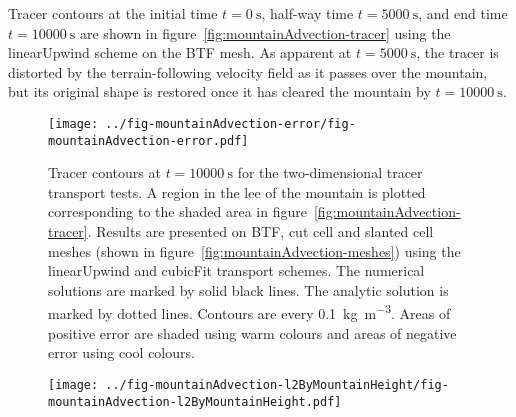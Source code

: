 Tracer contours at the initial time $t=\SI{0}{\second}$, half-way time $t=\SI{5000}{\second}$, and end time $t=\SI{10000}{\second}$ are shown in figure~\ref{fig:mountainAdvection-tracer} using the linearUpwind scheme on the BTF mesh.  As apparent at $t=\SI{5000}{\second}$, the tracer is distorted by the terrain-following velocity field as it passes over the mountain, but its original shape is restored once it has cleared the mountain by $t=\SI{10000}{\second}$.

\begin{figure}
	\centering
	\texttt{[image: ../fig-mountainAdvection-error/fig-mountainAdvection-error.pdf]}
	\caption{Tracer contours at $t=\SI{10000}{\second}$ for the two-dimensional tracer transport tests.  A region in the lee of the mountain is plotted corresponding to the shaded area in figure~\ref{fig:mountainAdvection-tracer}.  Results are presented on BTF, cut cell and slanted cell meshes (shown in figure~\ref{fig:mountainAdvection-meshes}) using the linearUpwind and cubicFit transport schemes.  The numerical solutions are marked by solid black lines.  The analytic solution is marked by dotted lines.  Contours are every \SI{0.1}{\kilo\gram\per\meter\cubed}.  Areas of positive error are shaded using warm colours and areas of negative error using cool colours.}
	\label{fig:mountainAdvection-errors}
\end{figure}


\begin{figure}
	\centering
	\texttt{[image: ../fig-mountainAdvection-l2ByMountainHeight/fig-mountainAdvection-l2ByMountainHeight.pdf]}
%
	\caption{}
	\label{fig:mountainAdvection-l2ByMountainHeight}
\end{figure}


